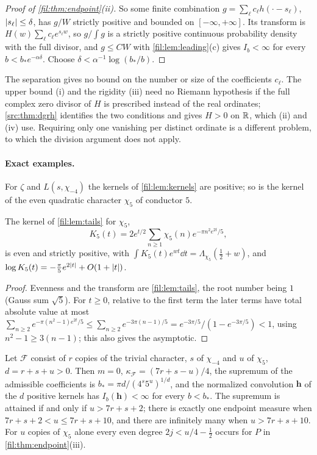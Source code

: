 \begin{proof}[Proof of \cref{fil:thm:endpoint}\textup{(ii)}]
So some finite combination $g=\sum_\ell c_\ell h(\cdot-s_\ell)$, $\lvert s_\ell\rvert\le\delta$, has $g/W$ strictly positive
and bounded on $[-\infty,+\infty]$. Its transform is $H(w)\sum_\ell c_\ell e^{s_\ell w}$, so $g/\int g$ is a strictly
positive continuous probability density with the full divisor, and $g\le CW$ with \cref{fil:lem:leading}(c) gives
$I_b<\infty$ for every $b<b_*e^{-\alpha\delta}$. Choose $\delta<\alpha^{-1}\log(b_*/b)$.
\end{proof}

The separation gives no bound on the number or size of the coefficients $c_\ell$. The upper bound (i) and the
rigidity (iii) need no Riemann hypothesis if the full complex zero divisor of $H$ is prescribed instead of
the real ordinates; \cref{src:thm:dgrh} identifies the two conditions and gives $H>0$ on $\mathbb{R}$, which (ii) and
(iv) use. Requiring only one vanishing per distinct ordinate is a different problem, to which the division
argument does not apply.

\paragraph{Exact examples.}
For $\zeta$ and $L(s,\chi_{-4})$ the kernels of \cref{fil:lem:kernels} are positive; so is the kernel of the even
quadratic character $\chi_5$ of conductor $5$.

\begin{lemma}\label{fil:lem:chifive}
The kernel of \cref{fil:lem:tails} for $\chi_5$,
\[
 K_5(t)=2e^{t/2}\sum_{n\ge1}\chi_5(n)e^{-\pi n^2e^{2t}/5},
\]
is even and strictly positive, with $\int K_5(t)e^{wt}\dd t=\Lambda_{\chi_5}(\tfrac12+w)$, and $\log K_5(t)=-\tfrac\pi5e^{2\lvert t\rvert}+O(1+\lvert t\rvert)$.
\end{lemma}

\begin{proof}
Evenness and the transform are \cref{fil:lem:tails}, the root number being $1$ (Gauss sum $\sqrt5$). For $t\ge0$,
relative to the first term the later terms have total absolute value at most
$\sum_{n\ge2}e^{-\pi(n^2-1)e^{2t}/5}\le\sum_{n\ge2}e^{-3\pi(n-1)/5}=e^{-3\pi/5}/(1-e^{-3\pi/5})<1$, using
$n^2-1\ge3(n-1)$; this also gives the asymptotic.
\end{proof}

\begin{theorem}\label{fil:thm:endpointex}
Let $\mathcal F$ consist of $r$ copies of the trivial character, $s$ of $\chi_{-4}$ and $u$ of $\chi_5$, $d=r+s+u>0$.
Then $m=0$, $\kappa_{\mathcal F}=(7r+s-u)/4$, the supremum of the admissible coefficients is
$b_*=\pi d/(4^s5^u)^{1/d}$, and the normalized convolution $\mathbf h$ of the $d$ positive kernels has
$I_b(\mathbf h)<\infty$ for every $b<b_*$. The supremum is attained if and only if $u>7r+s+2$; there is exactly one
endpoint measure when $7r+s+2<u\le7r+s+10$, and there are infinitely many when $u>7r+s+10$. For $u$ copies of
$\chi_5$ alone every even degree $2j<u/4-\tfrac12$ occurs for $P$ in \cref{fil:thm:endpoint}(iii).
\end{theorem}

